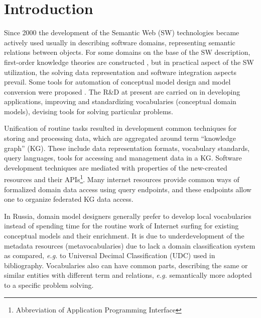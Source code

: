 \documentclass[
]{ceurart}
\begin{document}
\maketitle

\section{Introduction}

Since 2000 the development of the Semantic Web (SW) technologies became actively used usually in describing software domains, representing semantic relations between objects.  For some domains on the base of the SW description, first-order knowledge theories are constructed \cite{}, but in practical aspect of the SW utilization, the solving data representation and software integration aspects prevail.  Some tools for automation of conceptual model design and model conversion were proposed \cite{}.  The R\&D at present are carried on in developing applications, improving and standardizing vocabularies (conceptual domain models), devising tools for solving particular problems.

Unification of routine tasks resulted in development common techniques for storing and processing data, which are aggregated around term ``knowledge graph'' (KG).  These include data representation formats, vocabulary standards, query languages, tools for accessing and management data in a KG.  Software development techniques are mediated with properties of the new-created resources and their APIs\footnote{Abbreviation of Application Programming Interface}.  Many internet resources provide common ways of formalized domain data access using query endpoints, and these endpoints allow one to organize federated KG data access.

In Russia, domain model designers generally prefer to develop local vocabularies instead of spending time for the routine work of Internet surfing for existing conceptual models and their enrichment.  It is due to underdevelopment of the metadata resources (metavocabularies) due to lack a domain classification system as compared, \emph{e.g.} to Universal Decimal Classification (UDC) used in bibliography.  Vocabularies also can have common parts, describing the same or similar entities with different term and relations, \emph{e.g.} semantically more adopted to a specific problem solving.
\end{document}
